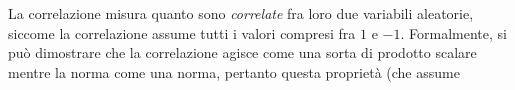 \documentclass{report}
\begin{document}
La correlazione misura quanto sono \emph{correlate} fra loro due variabili aleatorie, siccome la correlazione assume tutti i valori compresi fra $1$ e $-1$. Formalmente, si può dimostrare che la correlazione agisce come una sorta di prodotto scalare mentre la norma come una norma, pertanto questa proprietà (che assume























\pagebreak
\printindex
\end{document}
